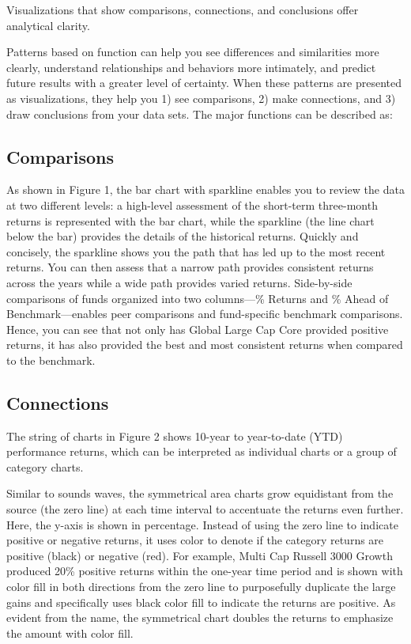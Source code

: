 \documentclass[]{book}
\theoremstyle{definition}
\theoremstyle{definition}
\theoremstyle{definition}
\theoremstyle{remark}
\begin{document}
Visualizations that show comparisons, connections, and conclusions offer
analytical clarity.

Patterns based on function can help you see differences and similarities
more clearly, understand relationships and behaviors more intimately,
and predict future results with a greater level of certainty. When these
patterns are presented as visualizations, they help you 1) see
comparisons, 2) make connections, and 3) draw conclusions from your data
sets. The major functions can be described as:

\subsection{Comparisons}\label{comparisons}

As shown in Figure 1, the bar chart with sparkline enables you to review
the data at two different levels: a high-level assessment of the
short-term three-month returns is represented with the bar chart, while
the sparkline (the line chart below the bar) provides the details of the
historical returns. Quickly and concisely, the sparkline shows you the
path that has led up to the most recent returns. You can then assess
that a narrow path provides consistent returns across the years while a
wide path provides varied returns. Side-by-side comparisons of funds
organized into two columns---\% Returns and \% Ahead of
Benchmark---enables peer comparisons and fund-specific benchmark
comparisons. Hence, you can see that not only has Global Large Cap Core
provided positive returns, it has also provided the best and most
consistent returns when compared to the benchmark.

\subsection{Connections}\label{connections}

The string of charts in Figure 2 shows 10-year to year-to-date (YTD)
performance returns, which can be interpreted as individual charts or a
group of category charts.

Similar to sounds waves, the symmetrical area charts grow equidistant
from the source (the zero line) at each time interval to accentuate the
returns even further. Here, the y-axis is shown in percentage. Instead
of using the zero line to indicate positive or negative returns, it uses
color to denote if the category returns are positive (black) or negative
(red). For example, Multi Cap Russell 3000 Growth produced 20\% positive
returns within the one-year time period and is shown with color fill in
both directions from the zero line to purposefully duplicate the large
gains and specifically uses black color fill to indicate the returns are
positive. As evident from the name, the symmetrical chart doubles the
returns to emphasize the amount with color fill.
\end{document}
